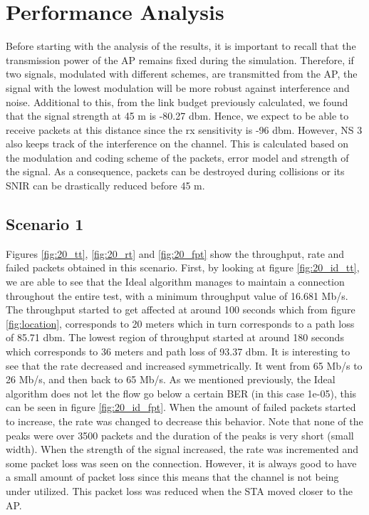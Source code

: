 \documentclass[12]{article}
\begin{document}
\section{Performance Analysis}

Before starting with the analysis of the results, it is important to recall that the transmission power of the AP remains fixed during the simulation. Therefore, if two signals, modulated with different schemes, are transmitted from the AP, the signal with the lowest modulation will be more robust against interference and noise. Additional to this, from the link budget previously calculated, we found that the signal strength at 45 m is -80.27 dbm. Hence, we expect to be able to receive packets at this distance since the rx sensitivity is -96 dbm. However, NS 3 also keeps track of the interference on the channel. This is calculated based on the modulation and coding scheme of the packets, error model and strength of the signal. As a consequence, packets can be destroyed during collisions or its SNIR can be drastically reduced before 45 m.  

\subsection{Scenario 1}

Figures \ref{fig:20_tt}, \ref{fig:20_rt} and \ref{fig:20_fpt} show the throughput, rate and failed packets obtained in this scenario. First, by looking at figure \ref{fig:20_id_tt}, we are able to see that the Ideal algorithm manages to maintain a connection throughout the entire test, with a minimum throughput value of 16.681 Mb/s. The throughput started to get affected at around 100 seconds which from figure \ref{fig:location}, corresponds to 20 meters which in turn corresponds to a path loss of 85.71 dbm. The lowest region of throughput started at around 180 seconds which corresponds to 36 meters and path loss of 93.37 dbm. It is interesting to see that the rate decreased and increased symmetrically. It went from 65 Mb/s to 26 Mb/s, and then back to 65 Mb/s. As we mentioned previously, the Ideal algorithm does not let the flow go below a certain BER (in this case 1e-05), this can be seen in figure \ref{fig:20_id_fpt}. When the amount of failed packets started to increase, the rate was changed to decrease this behavior. Note that none of the peaks were over 3500 packets and the duration of the peaks is very short (small width). When the strength of the signal increased, the rate was incremented and some packet loss was seen on the connection. However, it is always good to have a small amount of packet loss since this means that the channel is not being under utilized. This packet loss was reduced when the STA moved closer to the AP.\\
\end{document}
